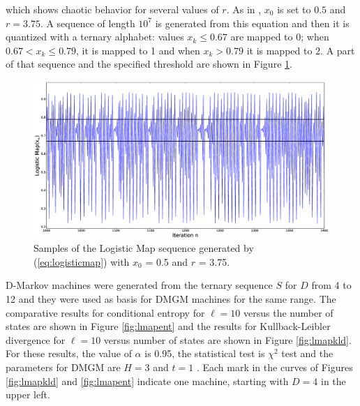 {\noindent which shows chaotic behavior for several values of $r$. As in \cite{asok.14}, $x_0$ is set to $0.5$ and $r = 3.75$. A sequence of length $10^7$ is generated from this equation and then it is quantized with a ternary alphabet: values $x_k \leq 0.67$ are mapped to $0$; when $0.67 < x_k \leq 0.79$, it is mapped to 1 and when $x_k > 0.79$ it is mapped to $2$. A part of that sequence and the specified threshold are shown in Figure \ref{fig:lmapseq}.

\begin{figure}[b]
\includegraphics[scale=0.25]{Figuras/logisticmap.eps}
\caption{Samples of the Logistic Map sequence generated by (\ref{eq:logisticmap}) with $x_0$ = 0.5 and $r$ = 3.75.\label{fig:lmapseq}}
\end{figure}

D-Markov machines were generated from the ternary sequence $S$ for $D$ from 4 to 12 and they were used as basis for DMGM machines for the same range. The comparative results for conditional entropy  for $\ell = 10$ versus the number of states are shown in Figure \ref{fig:lmapent} and the results for Kullback-Leibler divergence for $\ell = 10$ versus number of states are shown in Figure \ref{fig:lmapkld}. For these results, the value of $\alpha$ is 0.95, the statistical test is $\chi^2$ test and the parameters for DMGM are $H = 3$ and $t = 1$ . Each mark in the curves of Figures \ref{fig:lmapkld} and \ref{fig:lmapent} indicate one machine, starting with $D=4$ in the upper left.

}
